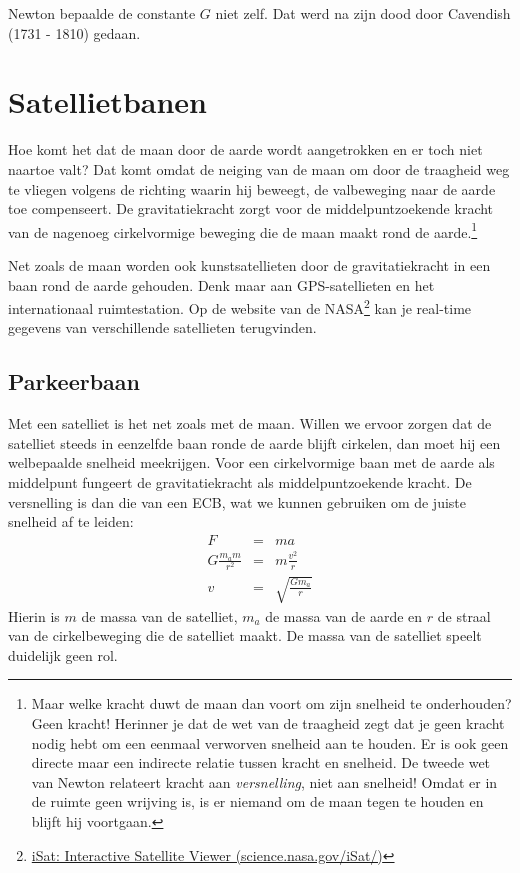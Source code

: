 Newton bepaalde de constante $G$ niet zelf. Dat werd na zijn dood door Cavendish (1731 - 1810) gedaan.

\newpage

\section{Satellietbanen}

Hoe komt het dat de maan door de aarde wordt aangetrokken en er toch niet naartoe valt? Dat komt omdat de neiging van de maan om door de traagheid weg te vliegen volgens de richting waarin hij beweegt, de valbeweging naar de aarde toe compenseert. De gravitatiekracht zorgt voor de middelpuntzoekende kracht van de nagenoeg cirkelvormige beweging die de maan maakt rond de aarde.\footnote{Maar welke kracht duwt de maan dan voort om zijn snelheid te onderhouden? Geen kracht! Herinner je dat de wet van de traagheid zegt dat je geen kracht nodig hebt om een eenmaal verworven snelheid aan te houden. Er is ook geen directe maar een indirecte relatie tussen kracht en snelheid. De tweede wet van Newton relateert kracht aan \textit{versnelling}, niet aan snelheid! Omdat er in de ruimte geen wrijving is, is er niemand om de maan tegen te houden en blijft hij voortgaan.}

Net zoals de maan worden ook kunstsatellieten door de gravitatiekracht in een baan rond de aarde gehouden. Denk maar aan GPS-satellieten en het internationaal ruimtestation. Op de website van de NASA\footnote{\href{http://science.nasa.gov/iSat/}{iSat: Interactive Satellite Viewer (science.nasa.gov/iSat/)}} kan je real-time gegevens van verschillende satellieten terugvinden.



\subsection{Parkeerbaan}

Met een satelliet is het net zoals met de maan. Willen we ervoor zorgen dat de satelliet steeds in eenzelfde baan ronde de aarde blijft cirkelen, dan moet hij een welbepaalde snelheid meekrijgen. Voor een cirkelvormige baan met de aarde als middelpunt fungeert de gravitatiekracht als middelpuntzoekende kracht. De versnelling is dan die van een ECB, wat we kunnen gebruiken om de juiste snelheid af te leiden:
\begin{eqnarray*}
F&=&ma\\
G\frac{m_am}{r^2}&=&m\frac{v^2}{r}\\
v&=&\sqrt{\frac{Gm_a}{r}}
\end{eqnarray*}
Hierin is $m$ de massa van de satelliet, $m_a$ de massa van de aarde en $r$ de straal van de cirkelbeweging die de satelliet maakt. De massa van de satelliet speelt duidelijk geen rol. 

